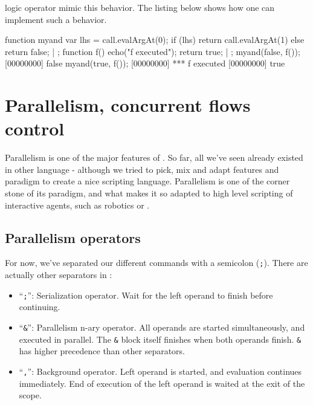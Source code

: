 \us logic operator mimic this behavior. The listing below shows how
one can implement such a behavior.

\begin{urbiscript}
function myand
{
  var lhs = call.evalArgAt(0);
  if (lhs)
    return call.evalArgAt(1)
  else
    return false;
} | {};
function f()
{
  echo("f executed");
  return true;
} | {};
myand(false, f());
[00000000] false
myand(true, f());
[00000000] *** f executed
[00000000] true
\end{urbiscript}


\chapter{Parallelism, concurrent flows control}
\label{sec:tut:concurrent}

Parallelism is one of the major features of \us. So far, all we've
seen already existed in other language - although we tried to pick,
mix and adapt features and paradigm to create a nice scripting
language. Parallelism is one of the corner stone of its paradigm, and
what makes it so adapted to high level scripting of interactive
agents, such as robotics or \ai.

\section{Parallelism operators}

For now, we've separated our different commands with a semicolon
(\lstinline{;}). There are actually other separators in \us:

\begin{itemize}
\item ``\lstinline{;}'': Serialization operator. Wait for the left
  operand to finish before continuing.
\item ``\lstinline{&}'': Parallelism n-ary operator. All operands are
  started simultaneously, and executed in parallel. The \lstinline{&}
  block itself finishes when both operands finish. \lstinline{&} has
  higher precedence than other separators.
\item ``\lstinline{,}'': Background operator. Left operand is started,
  and evaluation continues immediately. End of execution of the left
  operand is waited at the exit of the scope.
\end{itemize}

